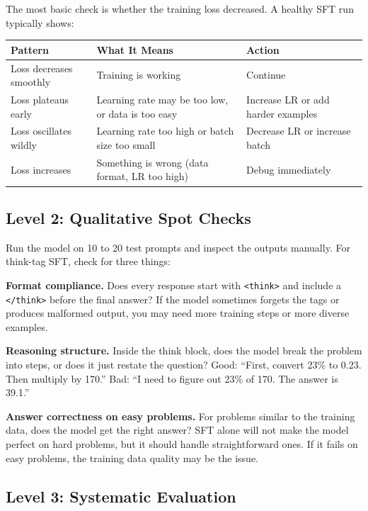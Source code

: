 \begin{chapterenv}
The most basic check is whether the training loss decreased. A healthy SFT run typically shows:

\begin{center}
\begin{tabular}{p{}p{}p{}}
\toprule
\textbf{Pattern} & \textbf{What It Means} & \textbf{Action} \\
\midrule
Loss decreases smoothly & Training is working & Continue \\
Loss plateaus early & Learning rate may be too low, or data is too easy & Increase LR or add harder examples \\
Loss oscillates wildly & Learning rate too high or batch size too small & Decrease LR or increase batch \\
Loss increases & Something is wrong (data format, LR too high) & Debug immediately \\
\bottomrule
\end{tabular}
\end{center}

\subsection{Level 2: Qualitative Spot Checks}

Run the model on 10 to 20 test prompts and inspect the outputs manually. For think-tag SFT, check for three things:

\textbf{Format compliance.} Does every response start with \texttt{<think>} and include a \texttt{</think>} before the final answer? If the model sometimes forgets the tags or produces malformed output, you may need more training steps or more diverse examples.

\textbf{Reasoning structure.} Inside the think block, does the model break the problem into steps, or does it just restate the question? Good: ``First, convert 23\% to 0.23. Then multiply by 170.'' Bad: ``I need to figure out 23\% of 170. The answer is 39.1.''

\textbf{Answer correctness on easy problems.} For problems similar to the training data, does the model get the right answer? SFT alone will not make the model perfect on hard problems, but it should handle straightforward ones. If it fails on easy problems, the training data quality may be the issue.

\subsection{Level 3: Systematic Evaluation}


\end{chapterenv}
